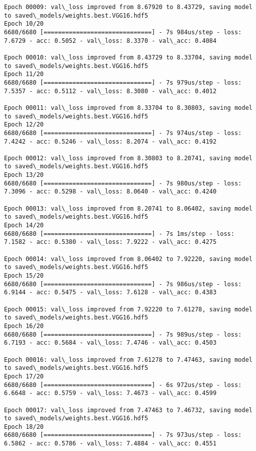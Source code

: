 \documentclass[11pt]{article}
\begin{document}
\begin{Verbatim}[commandchars=\\\{\}]
Epoch 00009: val\_loss improved from 8.67920 to 8.43729, saving model to saved\_models/weights.best.VGG16.hdf5
Epoch 10/20
6680/6680 [==============================] - 7s 984us/step - loss: 7.6729 - acc: 0.5052 - val\_loss: 8.3370 - val\_acc: 0.4084

Epoch 00010: val\_loss improved from 8.43729 to 8.33704, saving model to saved\_models/weights.best.VGG16.hdf5
Epoch 11/20
6680/6680 [==============================] - 7s 979us/step - loss: 7.5357 - acc: 0.5112 - val\_loss: 8.3080 - val\_acc: 0.4012

Epoch 00011: val\_loss improved from 8.33704 to 8.30803, saving model to saved\_models/weights.best.VGG16.hdf5
Epoch 12/20
6680/6680 [==============================] - 7s 974us/step - loss: 7.4242 - acc: 0.5246 - val\_loss: 8.2074 - val\_acc: 0.4192

Epoch 00012: val\_loss improved from 8.30803 to 8.20741, saving model to saved\_models/weights.best.VGG16.hdf5
Epoch 13/20
6680/6680 [==============================] - 7s 980us/step - loss: 7.3096 - acc: 0.5298 - val\_loss: 8.0640 - val\_acc: 0.4240

Epoch 00013: val\_loss improved from 8.20741 to 8.06402, saving model to saved\_models/weights.best.VGG16.hdf5
Epoch 14/20
6680/6680 [==============================] - 7s 1ms/step - loss: 7.1582 - acc: 0.5380 - val\_loss: 7.9222 - val\_acc: 0.4275

Epoch 00014: val\_loss improved from 8.06402 to 7.92220, saving model to saved\_models/weights.best.VGG16.hdf5
Epoch 15/20
6680/6680 [==============================] - 7s 986us/step - loss: 6.9144 - acc: 0.5475 - val\_loss: 7.6128 - val\_acc: 0.4383

Epoch 00015: val\_loss improved from 7.92220 to 7.61278, saving model to saved\_models/weights.best.VGG16.hdf5
Epoch 16/20
6680/6680 [==============================] - 7s 989us/step - loss: 6.7193 - acc: 0.5684 - val\_loss: 7.4746 - val\_acc: 0.4503

Epoch 00016: val\_loss improved from 7.61278 to 7.47463, saving model to saved\_models/weights.best.VGG16.hdf5
Epoch 17/20
6680/6680 [==============================] - 6s 972us/step - loss: 6.6648 - acc: 0.5759 - val\_loss: 7.4673 - val\_acc: 0.4599

Epoch 00017: val\_loss improved from 7.47463 to 7.46732, saving model to saved\_models/weights.best.VGG16.hdf5
Epoch 18/20
6680/6680 [==============================] - 7s 973us/step - loss: 6.5862 - acc: 0.5786 - val\_loss: 7.4884 - val\_acc: 0.4551


\end{Verbatim}
\end{document}
